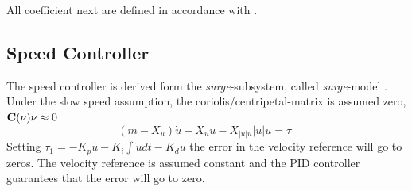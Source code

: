 	All coefficient next are defined in accordance with \cite{SNAME}.
	\subsection{Speed Controller}
		The speed controller is derived form the \textit{surge}-subsystem, called \textit{surge}-model
		\cite{fossen}. Under the slow speed assumption, the coriolis/centripetal-matrix is assumed
		zero, $\mathbf{C}(\mathbf{\nu})\mathbf{\nu} \approx 0$  
		\begin{equation}
			(m - X_{\dot{u}})\dot{u} - X_u u - X_{|u|u}|u| u = \tau_1
		\end{equation}
		Setting $\tau_1 = -K_p \tilde{u} - K_i \int \tilde{u} dt - K_d \dot{u}$ the error in the velocity
		reference will go to zeros. The velocity reference is assumed constant and the PID controller
		guarantees that the error will go to zero.
	
	
	
